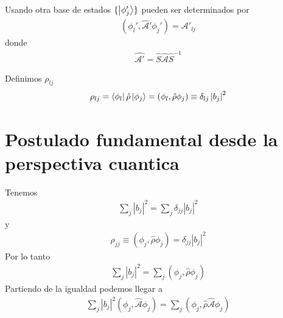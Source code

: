 \documentclass{article}
\begin{document}
Usando otra base de estados $ \{\ket{\phi_j' }\} $ pueden ser determinados por 
\begin{gather*}
  (\phi_l', \hat{\mathcal A }'\phi_j' ) = \mathcal A' _{lj }  
\end{gather*}
donde 
\begin{gather*}
  \hat{\mathcal A'} = \hat S \hat{\mathcal A} \hat S ^ {-1 }   
\end{gather*}

\hfill 

\hfill 

\hfill 

Definimos $ \rho _{lj }  $
\begin{gather*}
  \rho _{lj } = \bra{\phi _l }\hat \rho\ket{\phi_j } = (\phi_l, \hat \rho \phi_j ) \equiv \delta _{lj } \left|b_j \right| ^2   
\end{gather*}

\section{Postulado fundamental desde la perspectiva cuantica }
Tenemos 
\begin{gather*}
  \displaystyle\sum_{j }^{} \left|b_j \right| ^2 = \displaystyle\sum_{j }^{} \delta _{jj } \left|b_j \right| ^2 
\end{gather*}
y 
\begin{gather*}
  \rho _{jj }  \equiv (\phi_j , \hat \rho \phi_j ) = \delta _{jj } \left|b_j \right| ^2
\end{gather*}
Por lo tanto 
\begin{gather*}
  \displaystyle\sum_{j }^{} \left|b_j \right| ^2 = \displaystyle\sum_{j }^{} (\phi_j, \hat \rho \phi_j ) 
\end{gather*}
Partiendo de la igualdad podemos llegar a
\begin{gather*}
  \displaystyle\sum_{j }^{}\left|b_j \right| ^2(\phi_j, \hat{\mathcal A } \phi_j ) = \displaystyle\sum_{j }^{} (\phi_j, \hat \rho \hat{\mathcal A } \phi_j ) 
\end{gather*}
\end{document}
